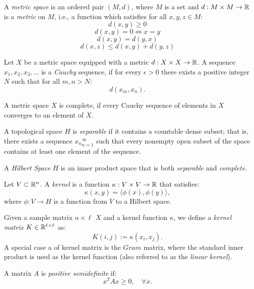 \begin{definition}\label{def:notation:metric_space}
A \emph{metric space} is an ordered pair $(M,d)$, where $M$ is a set and $d: M \times M \rightarrow \mathbb{R}$ is a \emph{metric} on $M$, i.e.,
a function which satisfies for all $x,y,z \in M$:
$$d(x,y) \geq 0$$
$$d(x,y) = 0 \Longleftrightarrow x = y$$
$$d(x,y) = d(y,x)$$
$$d(x,z) \leq d(x,y) + d(y,z)$$
\end{definition}

\begin{definition}\label{def:notation:cauchy_sequence}
Let $X$ be a metric space equipped with a metric $d: X \times X \rightarrow \mathbb{R}$. A sequence $x_1, x_2, x_3, \ldots$
is a \emph{Cauchy} sequence, if for every $\epsilon > 0$ there exists a positive integer $N$ such
that for all $m,n > N$:
$$ d(x_m, x_n).$$
\end{definition}

\begin{definition}\label{def:notation:complete_space}
A metric space $X$ is complete, if every Cauchy sequence of elements in $X$ converges to an element of $X$.
\end{definition}

\begin{definition}\label{def:notation:separable_space}
A topological space $H$ is \emph{separable} if it contains a countable dense subset; that is, there
exists a sequence ${x_n}_{n=1}^{\infty}$ such that every nonempty open subset of the space contains at least
one element of the sequence.
\end{definition}

\begin{definition}\label{def:notation:hilbert_space}
A \emph{Hilbert Space} $H$ is an inner product space that is both \emph{separable} and \emph{complete}.
\end{definition}

\begin{definition}\label{def:notation:kernel_function}
Let $V \subset \mathbb{R}^n$. A \emph{kernel} is a function $\kappa: V \times V \rightarrow \mathbb{R}$ that satisfies:
$$ \kappa(x,y) = \langle \phi(x), \phi(y) \rangle, $$
where $\phi: V \rightarrow H$ is a function from $V$ to a Hilbert space.
\end{definition}

\begin{definition}\label{def:notation:kernel_matrix}
Given a sample matrix $n\times\ell$ $X$ and a kernel function $\kappa$, we define a \emph{kernel matrix} $K \in \mathbb{R}^{\ell \times \ell}$ as:
$$ K(i,j) := \kappa(x_i, x_j).$$
A special case a of kernel matrix is the $Gram$ matrix, where the standard inner product is used as the kernel function (also referred to as the \emph{linear kernel}).
\end{definition}

\begin{definition}\label{def:notation:positive_semidefinite}
A matrix $A$ is \emph{positive semidefinite} if:
$$ x^T A x \geq 0,\quad \forall x.$$
\end{definition}

